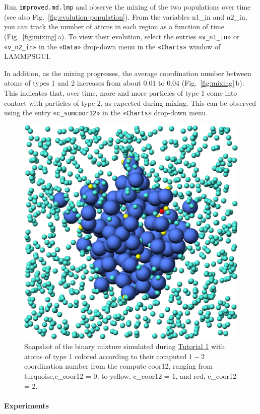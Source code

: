 \documentclass[9pt,tutorial]{livecoms}
\newcommand{\lmpcmd}[1]{\hspace{0pt}\colorbox{listing}{\textcolor{command}{\small{#1}}}\hspace{0pt}} %
\newcommand{\flecmd}[1]{\textcolor{command}{\texttt{#1}}} %
\newcommand{\guicmd}[1]{\textcolor{command}{\texttt{«#1»}}} %
\newcommand{\lammpsgui}{\textsf{LAMMPS\textendash GUI}}
\begin{document}
Run \flecmd{improved.md.lmp} and observe the mixing of the two populations
over time (see also Fig.~\ref{fig:evolution-population}).  From the
variables \lmpcmd{n1\_in} and \lmpcmd{n2\_in}, you can track the number
of atoms in each region as a function of time
(Fig.~\ref{fig:mixing}\,a).  To view their evolution, select the entries
\guicmd{v\_n1\_in} or \guicmd{v\_n2\_in} in the \guicmd{Data} drop-down
menu in the \guicmd{Charts} window of \lammpsgui{}.

In addition, as the mixing progresses, the average coordination number
between atoms of types 1 and 2 increases from about $0.01$ to $0.04$
(Fig.~\ref{fig:mixing}\,b).  This indicates that, over time, more and
more particles of type 1 come into contact with particles of type 2, as
expected during mixing.  This can be observed using the entry
\guicmd{c\_sumcoor12} in the \guicmd{Charts} drop-down menu.

\begin{figure}
\centering
\includegraphics[width=0.55\linewidth]{LJ-coords}
\caption{Snapshot of the binary mixture simulated
  during \hyperref[lennard-jones-label]{Tutorial 1} with atoms of type 1
  colored according to their computed $1-2$ coordination
  number from the compute \lmpcmd{coor12}, ranging from turquoise,\lmpcmd{c\_coor12 = 0},
  to yellow, \lmpcmd{c\_coor12 = 1}, and red, \lmpcmd{c\_coor12 = 2}.}
\label{fig:coords-viz}
\end{figure}

\paragraph{Experiments}
\end{document}
